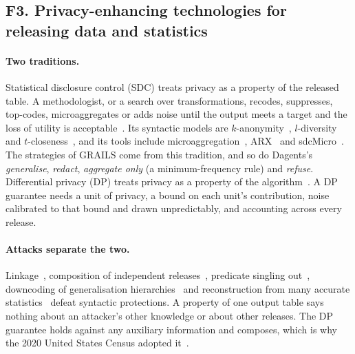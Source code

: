 \subsection{F3. Privacy-enhancing technologies for releasing data and statistics}
\label{sec:survey-pets}

\paragraph{Two traditions.} Statistical disclosure control (SDC) treats privacy
as a property of the released table. A methodologist, or a search over
transformations, recodes, suppresses, top-codes, microaggregates or adds noise
until the output meets a target and the loss of utility is
acceptable~\citep{hundepool2012statistical}. Its syntactic models are
\(k\)-anonymity~\citep{sweeney2002kanonymity}, \(l\)-diversity~\citep{machanavajjhala2007ldiversity}
and \(t\)-closeness~\citep{li2007tcloseness}, and its tools include
microaggregation~\citep{domingoferrer2002practical}, ARX~\citep{prasser2020flexible}
and sdcMicro~\citep{templ2015statistical}. The strategies of GRAILS come from
this tradition, and so do Dagents's \emph{generalise}, \emph{redact},
\emph{aggregate only} (a minimum-frequency rule) and \emph{refuse}.
Differential privacy (DP) treats privacy as a property of the
algorithm~\citep{dwork2006calibrating,dwork2014algorithmic}. A DP guarantee
needs a unit of privacy, a bound on each unit's contribution, noise calibrated to
that bound and drawn unpredictably, and accounting across every release.

\paragraph{Attacks separate the two.} Linkage~\citep{narayanan2008robust},
composition of independent releases~\citep{ganta2008composition}, predicate
singling out~\citep{cohen2020towards}, downcoding of generalisation
hierarchies~\citep{cohen2022attacks} and reconstruction from many accurate
statistics~\citep{dinur2003revealing,garfinkel2019understanding} defeat
syntactic protections. A property of one output table says nothing about an
attacker's other knowledge or about other releases. The DP guarantee holds
against any auxiliary information and composes, which is why the 2020 United
States Census adopted it~\citep{abowd2022topdown}.

